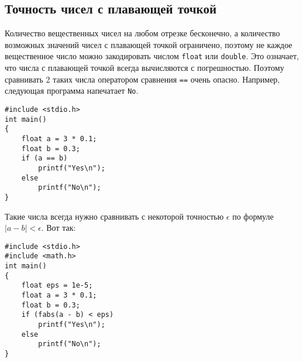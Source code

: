 \documentclass{article}
\begin{document}
\subsection*{Точность чисел с плавающей точкой}
Количество вещественных чисел на любом отрезке бесконечно, а количество возможных значений чисел с плавающей точкой ограничено, поэтому не каждое вещественное число можно закодировать числом \texttt{float} или \texttt{double}. Это означает, что числа с плавающей точкой всегда вычисляются с погрешностью. Поэтому сравнивать 2 таких числа оператором сравнения \texttt{==} очень опасно. Например, следующая программа напечатает \texttt{No}.
\begin{lstlisting}
#include <stdio.h>
int main() 
{
    float a = 3 * 0.1;
    float b = 0.3;
    if (a == b)
        printf("Yes\n");
    else
        printf("No\n");
}
\end{lstlisting}

Такие числа всегда нужно сравнивать с некоторой точностью $\epsilon$ по формуле $|a - b| < \epsilon$. Вот так:\\ 
\begin{lstlisting}
#include <stdio.h>
#include <math.h>
int main() 
{
    float eps = 1e-5;
    float a = 3 * 0.1;
    float b = 0.3;
    if (fabs(a - b) < eps)
        printf("Yes\n");
    else
        printf("No\n");
}
\end{lstlisting}
\end{document}
